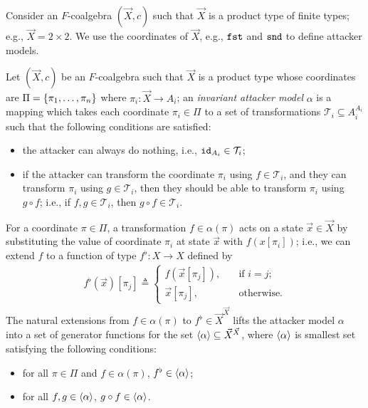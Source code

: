 Consider an $F$-coalgebra $(\vec{X},c)$ such that $\vec{X}$ is a product type of finite types; e.g., $\vec{X}=2\times 2$. We use the coordinates of $\vec{X}$, e.g., $\mathtt{\texttt{fst}}$ and $\mathtt{\texttt{snd}}$ to define attacker models. 
\begin{definition}
\label{def:Latent:InvariantAttackerModel}
Let $(\vec{X},c)$ be an $F$-coalgebra such that $\vec{X}$ is a product type whose coordinates are $\Pi=\left\{\pi_1, \ldots, \pi_n\right\}$ where $\pi_i\colon \vec{X}\rightarrow A_i$; an \emph{invariant attacker model} $\alpha$ is a mapping which takes each coordinate $\pi_i\in\Pi$ to a set of transformations $\mathcal{T}_i\subseteq A_i^{A_i}$ such that the following conditions are satisfied:
\begin{itemize}
    \item the attacker can always do nothing, i.e., ${\texttt{id}}_{A_i}\in \mathcal{T}_i$; 
    \item if the attacker can transform the coordinate $\pi_i$ using $f\in \mathcal{T}_i$, and they can transform $\pi_i$ using $g\in \mathcal{T}_i$, then they should be able to transform $\pi_i$ using $g\circ f$; i.e., if $f,g\in \mathcal{T}_i$, then $g\circ f\in \mathcal{T}_i$.
\end{itemize}
\end{definition}
For a coordinate $\pi\in \Pi$, a transformation $f\in\alpha(\pi)$ acts on a state $\vec{x}\in \vec{X}$ by substituting the value of coordinate $\pi_i$ at state $\vec{x}$ with $f(x[\pi_i])$; i.e., we can extend $f$ to a function of type $f^\flat\colon X\rightarrow X$ defined by 
\begin{align*}
    f^\flat(\vec{x})[\pi_j]\triangleq\begin{cases}
        f(\vec{x}[\pi_j]),&\quad\text{if $i=j$};\\
        \vec{x}[\pi_j],&\quad\text{otherwise.}
    \end{cases}
\end{align*}
The natural extensions from $f\in \alpha(\pi)$ to $f^\flat\in \vec{X}^{\vec{X}}$ lifts the attacker model $\alpha$ into a set of generator functions for the set ${{\left<\alpha\right>}}\subseteq \vec{X}^{\vec{X}}$, where ${{\left<\alpha\right>}}$ is smallest set satisfying the following conditions:
\begin{itemize}
    \item for all $\pi\in \Pi$ and $f\in \alpha(\pi)$, $f^\flat \in {{\left<\alpha\right>}}$;
    \item for all $f,g\in {{\left<\alpha\right>}}$, $g\circ f \in{{\left<\alpha\right>}}$.
\end{itemize}

